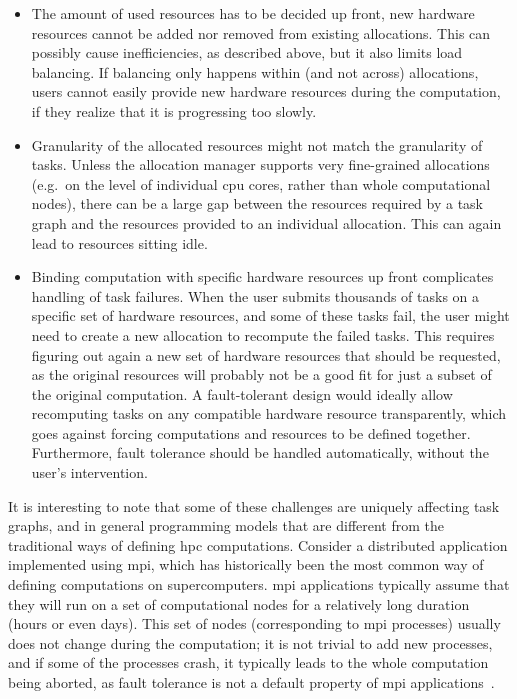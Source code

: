\begin{itemize}
	\item The amount of used resources has to be decided up front, new hardware resources cannot be added nor
	      removed from existing allocations. This can possibly cause inefficiencies, as described above, but
	      it also limits load balancing. If balancing only happens within (and not across) allocations, users
	      cannot easily provide new hardware resources during the computation, if they realize that it is
	      progressing too slowly.
	\item Granularity of the allocated resources might not match the granularity of tasks. Unless the
	      allocation manager supports very fine-grained allocations (e.g.\ on the level of individual
	      \gls{cpu} cores, rather than whole computational nodes), there can be a large gap
	      between the resources required by a task graph and the resources provided to an individual
	      allocation. This can again lead to resources sitting idle.
	\item Binding computation with specific hardware resources up front complicates handling of task
	      failures. When the user submits thousands of tasks on a specific set of hardware resources, and
	      some of these tasks fail, the user might need to create a new allocation to recompute the failed
	      tasks. This requires figuring out again a new set of hardware resources that should be requested,
	      as the original resources will probably not be a good fit for just a subset of the original
	      computation. A fault-tolerant design would ideally allow recomputing tasks on any compatible
	      hardware resource transparently, which goes against forcing computations and resources to be
	      defined together. Furthermore, fault tolerance should be handled automatically, without the user's
	      intervention.
\end{itemize}

It is interesting to note that some of these challenges are uniquely affecting task graphs, and in
general programming models that are different from the traditional ways of defining
\gls{hpc} computations. Consider a distributed application implemented using
\gls{mpi}, which has historically been the most common way of defining computations
on supercomputers. \gls{mpi} applications typically assume that they will run on a
set of computational nodes for a relatively long duration (hours or even days). This set of nodes
(corresponding to \gls{mpi} processes) usually does not change during the
computation; it is not trivial to add new processes, and if some of the processes crash, it
typically leads to the whole computation being aborted, as fault tolerance is not a default
property of \gls{mpi} applications~\cite{fault_tolerant_mpi}.

